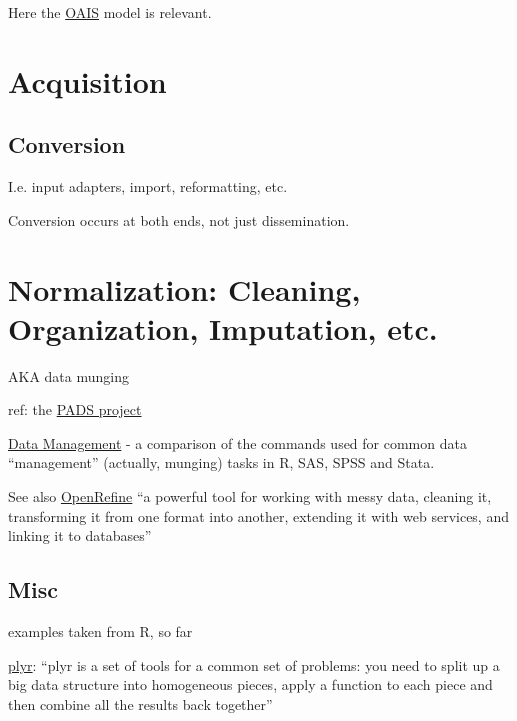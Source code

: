 \documentclass[reqno,12pt]{tufte-book}
\numberwithin{equation}{subsection}
\begin{document}
\begin{ednote}
  Here the
  \href{http://en.wikipedia.org/wiki/Open_Archival_Information_System}{OAIS}
  model is relevant.
\end{ednote}

\chapter{Acquisition}

\section{Conversion}
\label{sect:conversion}

I.e. input adapters, import, reformatting, etc.

Conversion occurs at both ends, not just dissemination.

\chapter{Normalization: Cleaning, Organization, Imputation, etc.}

AKA data munging

ref:  the \href{http://www.padsproj.org/index.html}{PADS project}

\href{http://r4stats.com/examples/data-management/}{Data Management} - a comparison of the commands used for common data ``management'' (actually, munging) tasks in R, SAS, SPSS and Stata.

See also \href{http://openrefine.org/}{OpenRefine} ``a powerful tool for working with messy data, cleaning it, transforming it from one format into another, extending it with web services, and linking it to databases''

\section{Misc}

\begin{remark}
  examples taken from R, so far
\end{remark}

\href{http://plyr.had.co.nz/}{plyr}: ``plyr is a set of tools for a
common set of problems: you need to split up a big data structure into
homogeneous pieces, apply a function to each piece and then combine
all the results back together''
\end{document}
